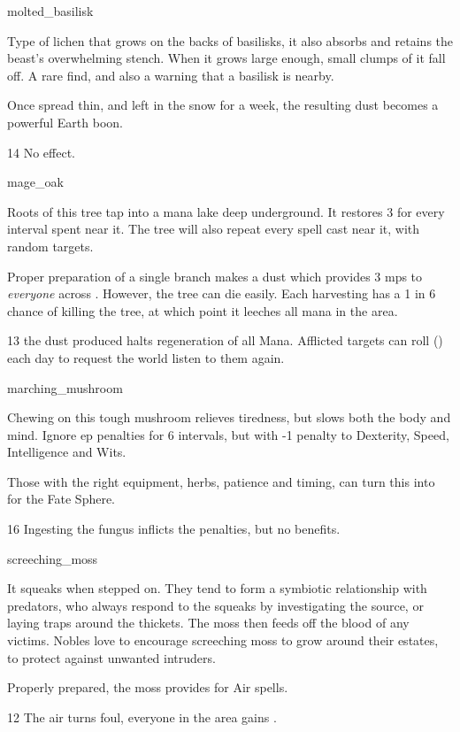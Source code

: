 \begin{multicols}{2}
%
  {molted_basilisk}%
  {
  Type of lichen that grows on the backs of basilisks, it also absorbs and retains the beast's overwhelming stench.
  When it grows large enough, small clumps of it fall off.
  A rare find, and also a warning that a basilisk is nearby.

  Once spread thin, and left in the snow for a week, the resulting dust becomes a powerful Earth \gls{boon}.
    }
{}%
{14}%
{No effect.}%

%
  {mage_oak}%
  {
    Roots of this tree tap into a mana lake deep underground.
    It restores 3  for every \gls{interval} spent near it.
    The tree will also repeat every spell cast near it, with random targets.

    Proper preparation of a single branch makes a dust which provides 3 \glspl{mp} to \emph{everyone} across .
    However, the tree can die easily.
    Each harvesting has a 1 in 6 chance of killing the tree, at which point it leeches all mana in the \gls{area}.
  }%
  {}%
  {13}%
  {the dust produced halts regeneration of all Mana.
  Afflicted targets can roll  (\tn[10]) each day to request the world listen to them again.}


%
  {marching_mushroom}%
  {
  Chewing on this tough mushroom relieves tiredness, but slows both the body and mind.
    Ignore \gls{ep} penalties for 6 \glspl{interval}, but with -1 penalty to Dexterity, Speed, Intelligence and Wits.

    Those with the right equipment, herbs, patience and timing, can turn this into  for the Fate Sphere.
    }
{}%
{16}%
{Ingesting the fungus inflicts the penalties, but no benefits.}%

%
  {screeching_moss}%
  {
  It squeaks when stepped on.
  They tend to form a symbiotic relationship with predators, who always respond to the squeaks by investigating the source, or laying traps around the thickets.
  The moss then feeds off the blood of any victims.
  Nobles love to encourage screeching moss to grow around their estates, to protect against unwanted intruders.

  Properly prepared, the moss provides  for Air spells.
    }
  {}%
  {12}%
  {The air turns foul, everyone in the \gls{area} gains .}%


\end{multicols}
